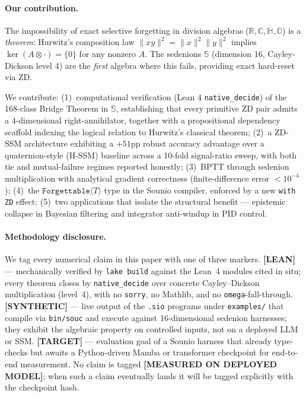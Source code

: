 \documentclass{article}
\newcommand{\Forgettable}[1]{\texttt{Forgettable}\langle #1 \rangle}
\begin{document}
\paragraph{Our contribution.}
The impossibility of exact selective forgetting in division algebras
($\mathbb{R}, \mathbb{C}, \mathbb{H}, \mathbb{O}$) is a \emph{theorem}:
Hurwitz's composition law $\|xy\|^2 = \|x\|^2\|y\|^2$ implies
$\ker(A \otimes \cdot) = \{0\}$ for any nonzero $A$.
The sedenions $\mathbb{S}$ (dimension 16, Cayley-Dickson level 4) are the
\emph{first} algebra where this fails, providing exact hard-reset via ZD.

We contribute:
(1)~computational verification (Lean 4 \texttt{native\_decide}) of the 168-class
Bridge Theorem in $\mathbb{S}$, establishing that every primitive ZD pair admits
a 4-dimensional right-annihilator, together with a propositional dependency
scaffold indexing the logical relation to Hurwitz's classical theorem;
(2)~a ZD-SSM architecture exhibiting a $+51$pp robust accuracy advantage over
a quaternion-style (H-SSM) baseline across a 10-fold signal-ratio sweep, with
both tie and mutual-failure regimes reported honestly;
(3)~BPTT through sedenion multiplication with analytical gradient correctness
(finite-difference error $<10^{-4}$);
(4)~the $\Forgettable{T}$ type in the Sounio compiler, enforced by a new
\texttt{with ZD} effect;
(5)~two applications that isolate the structural benefit --- epistemic collapse
in Bayesian filtering and integrator anti-windup in PID control.

\paragraph{Methodology disclosure.}
We tag every numerical claim in this paper with one of three markers.
\textbf{[LEAN]} --- mechanically verified by \texttt{lake build} against
the Lean~4 modules cited in situ; every theorem closes by
\texttt{native\_decide} over concrete Cayley--Dickson multiplication
(level~4), with no \texttt{sorry}, no Mathlib, and no \texttt{omega}-fall-through.
\textbf{[SYNTHETIC]} --- live output of the \texttt{.sio} programs under
\texttt{examples/} that compile via \texttt{bin/souc} and execute against
16-dimensional sedenion harnesses; they exhibit the algebraic property on
controlled inputs, not on a deployed LLM or SSM.
\textbf{[TARGET]} --- evaluation goal of a Sounio harness that already
type-checks but awaits a Python-driven Mamba or transformer checkpoint
for end-to-end measurement.
No claim is tagged \textbf{[MEASURED ON DEPLOYED MODEL]}; when such a claim
eventually lands it will be tagged explicitly with the checkpoint hash.
\end{document}
